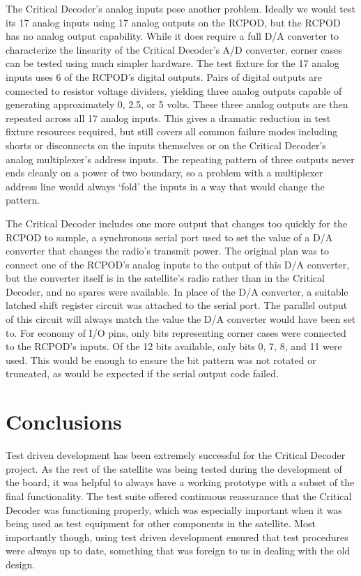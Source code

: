 \documentclass[letterpaper]{article}
\begin{document}
The Critical Decoder's analog inputs pose another problem. Ideally we would test its 17 analog inputs using 17
analog outputs on the RCPOD, but the RCPOD has no analog output capability. While it does require a full D/A converter
to characterize the linearity of the Critical Decoder's A/D converter, corner cases can be tested using much
simpler hardware. The test fixture for the 17 analog inputs uses 6 of the RCPOD's digital outputs. Pairs of
digital outputs are connected to resistor voltage dividers, yielding three analog outputs capable
of generating approximately 0, 2.5, or 5 volts. These three analog outputs are then repeated across all 17
analog inputs. This gives a dramatic reduction in test fixture resources required, but still covers all
common failure modes including shorts or disconnects on the inputs themselves or on the Critical Decoder's
analog multiplexer's address inputs. The repeating pattern of three outputs never ends cleanly on a power
of two boundary, so a problem with a multiplexer address line would always `fold' the inputs in a way that
would change the pattern.

The Critical Decoder includes one more output that changes too quickly for the RCPOD to sample, a synchronous
serial port used to set the value of a D/A converter that changes the radio's transmit power. The original plan
was to connect one of the RCPOD's analog inputs to the output of this D/A converter, but the converter itself
is in the satellite's radio rather than in the Critical Decoder, and no spares were available. In place of the
D/A converter, a suitable latched shift register circuit was attached to the serial port. The parallel output
of this circuit will always match the value the D/A converter would have been set to. For economy of I/O pins,
only bits representing corner cases were connected to the RCPOD's inputs. Of the 12 bits available, only bits
0, 7, 8, and 11 were used. This would be enough to ensure the bit pattern was not rotated or truncated, as would
be expected if the serial output code failed.

\section{Conclusions}

Test driven development has been extremely successful for the Critical Decoder project. As the rest of the
satellite was being tested during the development of the board, it was helpful to always have a working
prototype with a subset of the final functionality. The test suite offered continuous reassurance that the
Critical Decoder was functioning properly, which was especially important when it was being used as
test equipment for other components in the satellite. Most importantly though, using test driven development
ensured that test procedures were always up to date, something that was foreign to us in dealing with the
old design.
\end{document}
